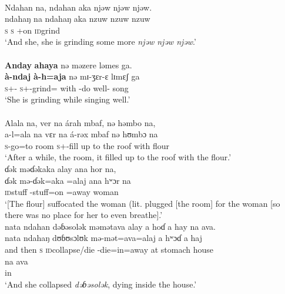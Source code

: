 \medskip
\largerpage
{}\\
 Ndahan  na,  ndahan  aka  njəw  njəw  njəw.\\   
\gll  ndahaŋ  na ndahaŋ aka {nzuw  nzuw  nzuw}\\
      \textsc{s}  {\PSP}  \textsc{s}   {\EXT}+on  {\textsc{id}grind}\\
\glt  ‘And she, she is grinding some more \textit{njəw  njəw  njəw}.’ \\
\medskip
{}\\
\textbf{Anday}  \textbf{ahaya}  nə  məzere  ləmes  ga.\\ 
\gll  \textbf{à-ndaj} \textbf{à-h=aja} nə mɪ{}-ʒɛr-ɛ lɪmɛʃ ga\\
      \textsc{s}+{\PFV}-{\PRG}  \textsc{s}+{\PFV}-grind={\PLU}  with   {\NOM}{}-{do well}-{\CL}  song     {\ADJ}\\
\glt  ‘She is grinding while singing well.’\\

\medskip
{}\\
Alala  na,  ver  na  árah  mbaf,  nə  həmbo  na, \\  
\gll  a-l=ala na vɛr na á-rəx  mbaf nə  hʊmbɔ   na\\
      \textsc{s}-go=to   {\PSP}  room     {\PSP}  \textsc{s}+{\IFV}-fill  {up to the roof}  with  flour  {\PSP}\\
\glt  ‘After a while, the room, it filled up to the roof with the flour.’\\

\medskip
ɗək  məɗəkaka  alay  ana  hor  na,\\ 
\gll  ɗək mə-ɗək=aka =alaj ana hʷɔr na\\
      \textsc{id}stuff    {\NOM}{}-stuff=on  =away     {\DAT}  woman  {\PSP}\\
\glt  ‘[The flour] suffocated the woman (lit. plugged [the room] for the woman [so there was no place for her to even breathe].’ \\

\medskip
nata  ndahan  dəɓəsolək  məmətava  alay  a  hoɗ  a  hay  na  ava.\\
\gll  nata ndahaŋ dʊɓʊsɔlʊk mə-mət=ava=alaj a hʷɔɗ a haj\\ 
      {and then}  \textsc{s}   {\textsc{id}collapse/die}  {\NOM}-die=in=away   at  stomach {\GEN}   house\\  
\medskip     
\gll na ava\\
    {\PSP}   in\\ 
\glt  ‘And she collapsed \textit{dəɓəsolək}, dying inside the house.’\\
\z
{}
